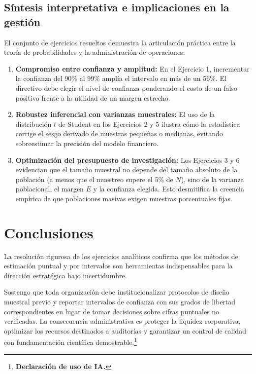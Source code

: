 {\subsection{Síntesis interpretativa e implicaciones en la gestión}
El conjunto de ejercicios resueltos demuestra la articulación práctica entre la teoría de probabilidades y la administración de operaciones:
\begin{enumerate}
  \item \textbf{Compromiso entre confianza y amplitud:} En el Ejercicio 1, incrementar la confianza del 90\% al 99\% amplía el intervalo en más de un 56\%. El directivo debe elegir el nivel de confianza ponderando el costo de un falso positivo frente a la utilidad de un margen estrecho.
  \item \textbf{Robustez inferencial con varianzas muestrales:} El uso de la distribución $t$ de Student en los Ejercicios 2 y 5 ilustra cómo la estadística corrige el sesgo derivado de muestras pequeñas o medianas, evitando sobreestimar la precisión del modelo financiero.
  \item \textbf{Optimización del presupuesto de investigación:} Los Ejercicios 3 y 6 evidencian que el tamaño muestral no depende del tamaño absoluto de la población (a menos que el muestreo supere el 5\% de $N$), sino de la varianza poblacional, el margen $E$ y la confianza elegida. Esto desmitifica la creencia empírica de que poblaciones masivas exigen muestras porcentuales fijas.
\end{enumerate}

\section{Conclusiones}
La resolución rigurosa de los ejercicios analíticos confirma que los métodos de estimación puntual y por intervalos son herramientas indispensables para la dirección estratégica bajo incertidumbre. 

Sostengo que toda organización debe institucionalizar protocolos de diseño muestral previo y reportar intervalos de confianza con sus grados de libertad correspondientes en lugar de tomar decisiones sobre cifras puntuales no verificadas. La consecuencia administrativa es proteger la liquidez corporativa, optimizar los recursos destinados a auditorías y garantizar un control de calidad con fundamentación científica demostrable.\footnote{\textbf{Declaración de uso de IA.} \estadisticadeclaracionia}

}
